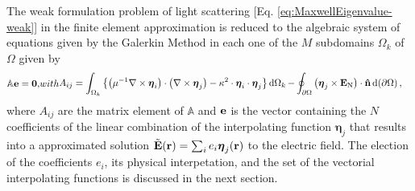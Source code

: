 The weak formulation problem of light scattering  [Eq. \eqref{eq:MaxwellEigenvalue-weak}] in the finite element approximation is reduced to the algebraic system of equations given by the Galerkin Method in each one of the $M$ subdomains $\Omega_k$ of $\Omega$ given by \cite{larson_finite_2013,jin_theory_2010}
%
\begin{subequations}
        \label{eq:Vec-FEM}
\begin{align}
    \mathbb{A} \vb{e} = \vb{0},
\end{align}%
with
\begin{align}
    A_{ij}  =     \int_{\Omega_k} \left\{\qty(\mu^{-1}\nabla\times\boldsymbol{\eta}_i)\cdot \qty(\nabla\times\boldsymbol{\eta}_j) -  \kappa^2  \cdot   \boldsymbol{\eta}_i \cdot \boldsymbol{\eta}_j \right\} \dd{\Omega_k}
            -& \oint_{\partial\Omega} \qty(\boldsymbol{\eta}_j\times \vb{E}_\text{N}) \cdot\vu{n}\dd{(\partial\Omega)},
\end{align}%
\end{subequations}%
\noindent%
%
where $A_{ij}$ are the matrix element of $\mathbb{A}$ and  $\vb{e}$ is the vector containing the $N$ coefficients of the linear combination of the interpolating function $\boldsymbol{\eta}_j$ that results into a approximated solution $\tilde{\vb{E}}(\vb{r}) = \sum_i e_i \boldsymbol{\eta}_j(\vb{r})$ to the electric field. The election of the coefficients $e_i$, its physical interpetation, and the set of the vectorial interpolating functions  is discussed in the next section.

